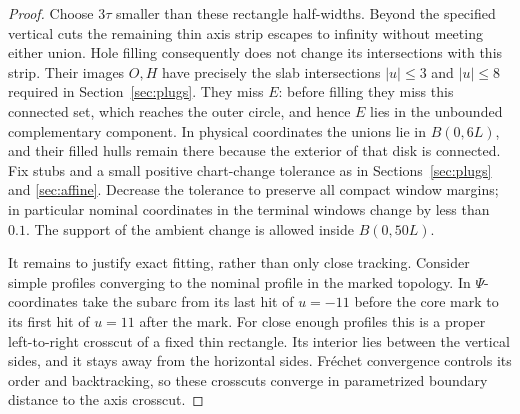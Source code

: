 \begin{proof}
Choose $3\tau$ smaller than these rectangle half-widths.  Beyond the
specified vertical cuts the remaining thin axis strip escapes to
infinity without meeting either union.  Hole filling consequently
does not change its intersections with this strip.  Their images $O,H$
have precisely the slab intersections $|u|\le3$ and $|u|\le8$ required
in Section~\ref{sec:plugs}.  They miss $E$: before filling they miss
this connected set, which reaches the outer circle, and hence $E$ lies
in the unbounded complementary component.  In physical coordinates
the unions lie in $B(0,6L)$, and their filled hulls remain there because
the exterior of that disk is connected.  Fix stubs and a small positive
chart-change tolerance as in Sections~\ref{sec:plugs} and
\ref{sec:affine}.  Decrease the tolerance to preserve all compact
window margins; in particular nominal coordinates in the terminal
windows change by less than $0.1$.  The support of the ambient change
is allowed inside $B(0,50L)$.

It remains to justify exact fitting, rather than only close tracking.
Consider simple profiles converging to the nominal profile in the
marked topology.  In $\Psi$-coordinates take the subarc from its last
hit of $u=-11$ before the core mark to its first hit of $u=11$ after
the mark.  For close enough profiles this is a proper left-to-right
crosscut of a fixed thin rectangle.  Its interior lies between the
vertical sides, and it stays away from the horizontal sides.
Fr\'echet convergence controls its order and backtracking, so these
crosscuts converge in parametrized boundary distance to the axis
crosscut.


\end{proof}
